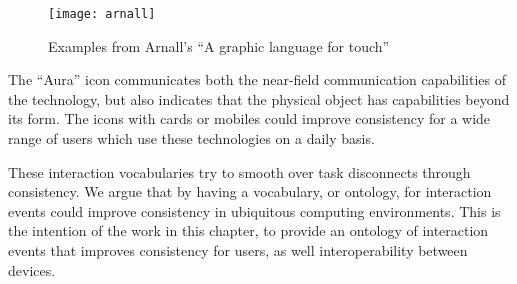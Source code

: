 \begin{figure}[bth]
	\begin{center}
        \texttt{[image: arnall]}
	\end{center}
        \caption{Examples from Arnall's ``A graphic language for touch'' \cite{Arnall2006}}
        \label{arnall}
\end{figure}

The ``Aura'' icon communicates both the near-field communication capabilities of the technology, but also indicates that the physical object has capabilities beyond its form. The icons with cards or mobiles could improve consistency for a wide range of users which use these technologies on a daily basis.

These interaction vocabularies try to smooth over task disconnects through consistency. We argue that by having a vocabulary, or ontology, for interaction events could improve consistency in ubiquitous computing environments. This is the intention of the work in this chapter, to provide an ontology of interaction events that improves consistency for users, as well interoperability between devices.











% 
% 
